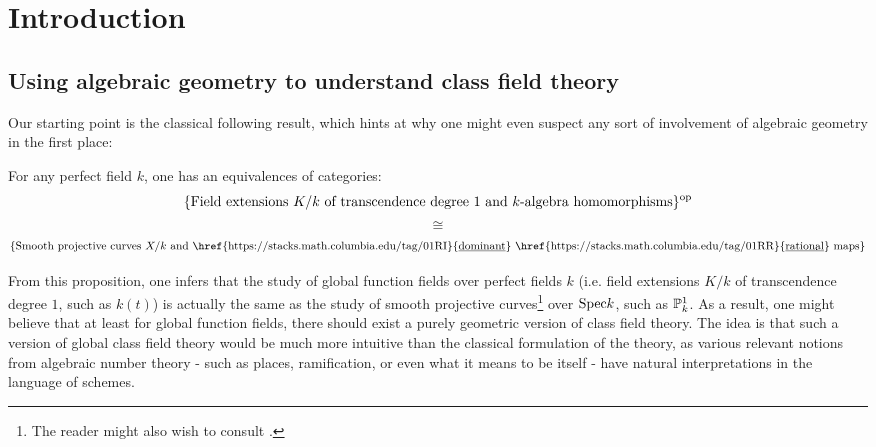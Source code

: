 \section{Introduction}
    \subsection{Using algebraic geometry to understand class field theory}
        Our starting point is the classical following result, which hints at why one might even suspect any sort of involvement of algebraic geometry in the first place:
        \begin{proposition} \label{prop: curves_and_function_fields}
            \cite[\href{https://stacks.math.columbia.edu/tag/0BY1}{Tag 0BY1}]{stacks} For any perfect field $k$, one has an equivalences of categories:
                $$\{\text{Field extensions $K/k$ of transcendence degree $1$ and $k$-algebra homomorphisms}\}^{\op}$$
                $$\cong$$
                $$\{\text{Smooth projective curves $X/k$ and \href{https://stacks.math.columbia.edu/tag/01RI}{\underline{dominant}} \href{https://stacks.math.columbia.edu/tag/01RR}{\underline{rational}} maps}\}$$
        \end{proposition}
        From this proposition, one infers that the study of global function fields over perfect fields $k$ (i.e. field extensions $K/k$ of transcendence degree $1$, such as $k(t)$) is actually the same as the study of smooth projective curves\footnote{The reader might also wish to consult \cite[Sections I.13 and I.14]{neukirch_2010_algebraic_number_theory}.} over $\Spec k$, such as $\P^1_k$. As a result, one might believe that at least for global function fields, there should exist a purely geometric version of class field theory. The idea is that such a version of global class field theory would be much more intuitive than the classical formulation of the theory, as various relevant notions from algebraic number theory - such as places, ramification, or even what it means to be  itself - have natural interpretations in the language of schemes. 
        
